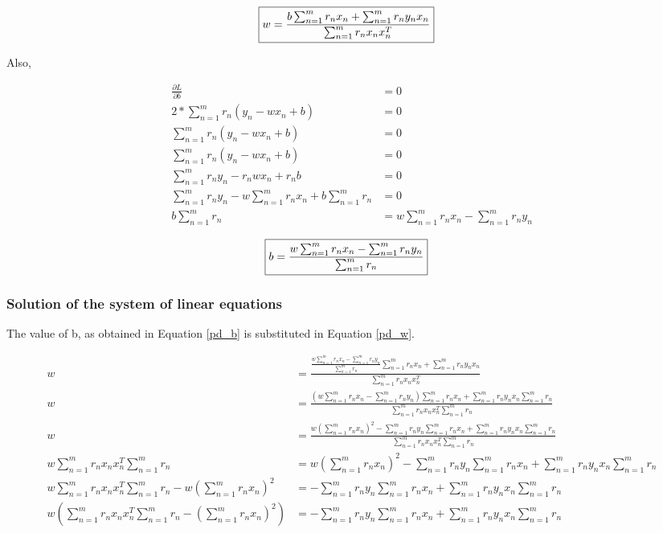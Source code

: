 \documentclass[a4paper]{article}
\begin{document}
\begin{align}
\label{pd_w}
	\Aboxed{w  = \frac{b \sum_{n=1}^m r_n x_n + \sum_{n=1}^m r_n y_n x_n} {\sum_{n=1}^m r_n x_n x_n^T}}
\end{align}

\vspace{5mm}

Also, 

\begin{align*}
	\frac{\partial L}{\partial b} &= 0\\
	2 * \sum_{n=1}^m r_n (y_n - w x_n + b) &= 0\\
	\sum_{n=1}^m r_n (y_n - w x_n + b) &= 0\\
	\sum_{n=1}^m r_n (y_n - w x_n + b) &= 0\\
	\sum_{n=1}^m r_n y_n - r_n w x_n + r_n b &= 0\\
	\sum_{n=1}^m r_n y_n - w \sum_{n=1}^m r_n x_n + b \sum_{n=1}^m r_n &= 0\\
	b \sum_{n=1}^m r_n &= w \sum_{n=1}^m r_n x_n - \sum_{n=1}^m r_n y_n
\end{align*}

\begin{align}
\label{pd_b}
	\Aboxed{b = \frac{w \sum_{n=1}^m r_n x_n - \sum_{n=1}^m  r_n y_n}{\sum_{n=1}^m  r_n}}
\end{align}


\subsubsection{Solution of the system of linear equations}

The value of b, as obtained in Equation \ref{pd_b} is substituted in Equation \ref{pd_w}.

\begin{align*}
	w &= \frac{\frac{w \sum_{n=1}^m r_n x_n - \sum_{n=1}^m r_n y_n}{\sum_{n=1}^m r_n} \sum_{n=1}^m r_n x_n + \sum_{n=1}^m r_n y_n x_n} {\sum_{n=1}^m r_n x_n x_n^T}\\
	w &= \frac{(w \sum_{n=1}^m r_n x_n - \sum_{n=1}^m r_n y_n) \sum_{n=1}^m r_n x_n + \sum_{n=1}^m r_n y_n x_n \sum_{n=1}^m r_n} {\sum_{n=1}^m r_n x_n x_n^T \sum_{n=1}^m r_n}\\
	w &= \frac{w ({\sum_{n=1}^m r_n x_n})^2 - \sum_{n=1}^m r_n y_n \sum_{n=1}^m r_n x_n + \sum_{n=1}^m r_n y_n x_n \sum_{n=1}^m r_n} {\sum_{n=1}^m r_n x_n x_n^T \sum_{n=1}^m r_n}\\
	w \sum_{n=1}^m r_n x_n x_n^T \sum_{n=1}^m  r_n &= w ({\sum_{n=1}^m r_n x_n})^2 - \sum_{n=1}^m  r_n y_n \sum_{n=1}^m  r_n x_n + \sum_{n=1}^m  r_n y_n x_n \sum_{n=1}^m  r_n\\
	w \sum_{n=1}^m r_n x_n x_n^T \sum_{n=1}^m  r_n - w ({\sum_{n=1}^m r_n x_n})^2 &= - \sum_{n=1}^m  r_n y_n \sum_{n=1}^m  r_n x_n + \sum_{n=1}^m  r_n y_n x_n \sum_{n=1}^m  r_n\\
	w (\sum_{n=1}^m r_n x_n x_n^T \sum_{n=1}^m  r_n - ({\sum_{n=1}^m r_n x_n})^2) &= - \sum_{n=1}^m  r_n y_n \sum_{n=1}^m  r_n x_n + \sum_{n=1}^m  r_n y_n x_n \sum_{n=1}^m  r_n\\
\end{align*}
\end{document}
